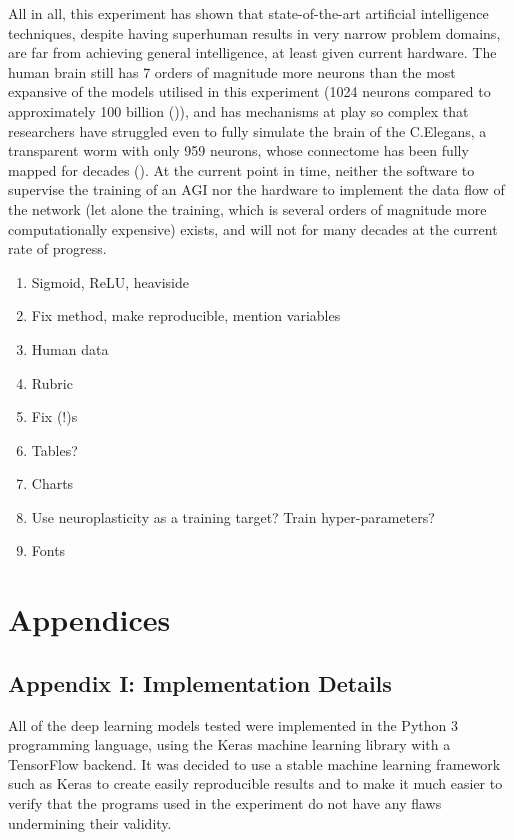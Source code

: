 \documentclass[]{report}
\begin{document}
All in all, this experiment has shown that state-of-the-art artificial intelligence techniques, despite having superhuman results in very narrow problem domains, are far from achieving general intelligence, at least given current hardware. The human brain still has 7 orders of magnitude more neurons than the most expansive of the models utilised in this experiment (1024 neurons compared to approximately 100 billion (\cite{herculano2009human})), and has mechanisms at play so complex that researchers have struggled even to fully simulate the brain of the C.Elegans, a transparent worm with only 959 neurons, whose connectome has been fully mapped for decades (\cite{wormwiring2012}). At the current point in time, neither the software to supervise the training of an AGI nor the hardware to implement the data flow of the network (let alone the training, which is several orders of magnitude more computationally expensive) exists, and will not for many decades at the current rate of progress.

\begin{enumerate}
	\item Sigmoid, ReLU, heaviside
	\item Fix method, make reproducible, mention variables
	\item Human data
	\item Rubric
	\item Fix (!)s
	\item Tables?
	\item Charts
	\item Use neuroplasticity as a training target? Train hyper-parameters?
	\item Fonts
\end{enumerate}

\section{Appendices}

\label{sec:Appendix_I}
\subsection{Appendix I: Implementation Details}

All of the deep learning models tested were implemented in the Python 3 programming language, using the Keras machine learning library with a TensorFlow backend. It was decided to use a stable machine learning framework such as Keras to create easily reproducible results and to make it much easier to verify that the programs used in the experiment do not have any flaws undermining their validity.
\end{document}
